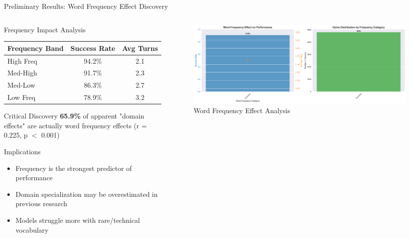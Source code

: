 \documentclass[aspectratio=169]{beamer}
\begin{document}
\begin{frame}{Preliminary Results: Word Frequency Effect Discovery}
\begin{columns}[c]
\begin{column}{0.5\textwidth}
\begin{block}{Frequency Impact Analysis}
\begin{center}
\begin{tabular}{lcc}
\toprule
\textbf{Frequency Band} & \textbf{Success Rate} & \textbf{Avg Turns} \\
\midrule
High Freq & 94.2\% & 2.1 \\
Med-High & 91.7\% & 2.3 \\
Med-Low & 86.3\% & 2.7 \\
Low Freq & 78.9\% & 3.2 \\
\bottomrule
\end{tabular}
\end{center}
\end{block}

\begin{alertblock}{Critical Discovery}
\textbf{65.9\%} of apparent "domain effects" are actually word frequency effects (r = 0.225, p $<$ 0.001)
\end{alertblock}

\begin{block}{Implications}
\begin{itemize}
    \item Frequency is the strongest predictor of performance
    \item Domain specialization may be overestimated in previous research
    \item Models struggle more with rare/technical vocabulary
\end{itemize}
\end{block}
\end{column}

\begin{column}{0.48\textwidth}
\begin{figure}
\includegraphics[width=\textwidth]{comprehensive_figures/figure4_frequency.png}
\caption{Word Frequency Effect Analysis}
\end{figure}
\end{column}
\end{columns}
\end{frame}
\end{document}
